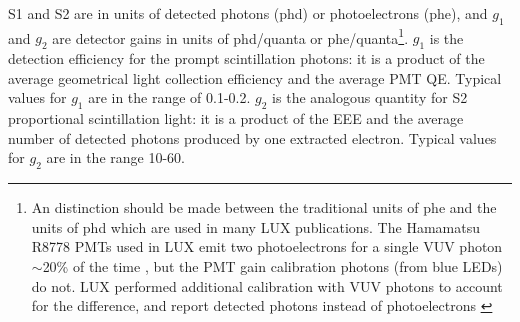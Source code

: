 S1 and S2 are in units of detected photons (phd) or photoelectrons (phe), and $g_{1}$ and $g_{2}$ are detector gains in units of phd/quanta or phe/quanta\footnote{An distinction should be made between the traditional units of phe and the units of phd which are used in many LUX publications. The Hamamatsu R8778 PMTs used in LUX emit two photoelectrons for a single VUV photon $\sim$20\% of the time \cite{Faham2015}, but the PMT gain calibration photons (from blue LEDs) do not. LUX performed additional calibration with VUV photons to account for the difference, and report detected photons instead of photoelectrons \cite{LUX:Run03Comprehensive}}. $g_{1}$ is the detection efficiency for the prompt scintillation photons: it is a product of the average geometrical light collection efficiency and the average \ac{PMT} \ac{QE}. Typical values for $g_{1}$ are in the range of 0.1-0.2. $g_{2}$ is the analogous quantity for S2 proportional scintillation light: it is a product of the \ac{EEE} and the average number of detected photons produced by one extracted electron. Typical values for $g_{2}$ are in the range 10-60.



